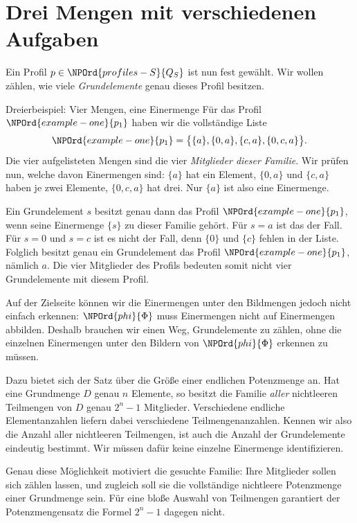 \section*{Drei Mengen mit verschiedenen Aufgaben}

Ein Profil \(p\in \NPOrd{profiles-S}{Q_S}\) ist nun fest gewählt. Wir wollen zählen,
wie viele \emph{Grundelemente} genau dieses Profil besitzen.

\begin{NPReadingExample}{Dreierbeispiel: Vier Mengen, eine Einermenge}
Für das Profil \(\NPOrd{example-one}{p_1}\) haben wir die vollständige Liste
\[
 \NPOrd{example-one}{p_1}=\bigl\{\{a\},\{0,a\},\{c,a\},\{0,c,a\}\bigr\}.
\]
Die vier aufgelisteten Mengen sind die vier \emph{Mitglieder dieser
Familie}. Wir prüfen nun, welche davon Einermengen sind:
\(\{a\}\) hat ein Element, \(\{0,a\}\) und \(\{c,a\}\) haben
je zwei Elemente, \(\{0,c,a\}\) hat drei. Nur \(\{a\}\) ist
also eine Einermenge.

Ein Grundelement \(s\) besitzt genau dann das Profil \(\NPOrd{example-one}{p_1}\),
wenn seine Einermenge \(\{s\}\) zu dieser Familie gehört.
Für \(s=a\) ist das der Fall. Für \(s=0\) und \(s=c\) ist es
nicht der Fall, denn \(\{0\}\) und \(\{c\}\) fehlen in der Liste.
Folglich besitzt genau ein Grundelement das Profil \(\NPOrd{example-one}{p_1}\), nämlich
\(a\). Die vier Mitglieder des Profils bedeuten somit nicht vier
Grundelemente mit diesem Profil.
\end{NPReadingExample}

Auf der Zielseite können wir die Einermengen unter den Bildmengen
jedoch nicht einfach erkennen: \(\NPOrd{phi}{\Phi}\) muss Einermengen nicht auf
Einermengen abbilden. Deshalb brauchen wir einen Weg, Grundelemente
zu zählen, ohne die einzelnen Einermengen unter den Bildern von
\(\NPOrd{phi}{\Phi}\) erkennen zu müssen.

Dazu bietet sich der Satz über die Größe einer endlichen Potenzmenge
an. Hat eine Grundmenge \(D\) genau \(n\) Elemente, so besitzt die
Familie \emph{aller} nichtleeren Teilmengen von \(D\) genau
\(2^n-1\) Mitglieder. Verschiedene endliche Elementanzahlen liefern
dabei verschiedene Teilmengenanzahlen. Kennen wir also die Anzahl
aller nichtleeren Teilmengen, ist auch die Anzahl der Grundelemente
eindeutig bestimmt. Wir müssen dafür keine einzelne Einermenge
identifizieren.

Genau diese Möglichkeit motiviert die gesuchte Familie: Ihre
Mitglieder sollen sich zählen lassen, und zugleich soll sie die
vollständige nichtleere Potenzmenge einer Grundmenge sein.
Für eine bloße Auswahl von Teilmengen garantiert der Potenzmengensatz
die Formel \(2^n-1\) dagegen nicht.

